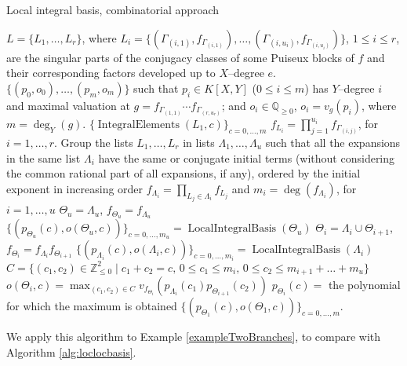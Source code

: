 \documentclass[a4paper,11pt]{amsart}%
\theoremstyle{definition}
\theoremstyle{plain}
\theoremstyle{remark}
\DeclareMathOperator{\LocalIntegralBasis}{LocalIntegralBasis}
\DeclareMathOperator{\IntegralElement}{IntegralElements}
\newcommand{\Q}{{\mathbb Q}}
\newcommand{\Z}{{\mathbb Z}}
\begin{document}
\begin{algorithm}                      %
\caption{Local integral basis, combinatorial approach}          %
\label{alg:directApproach}
\begin{algorithmic}[1]
\REQUIRE $L = \{L_1, \dots, L_r\}$, where $L_i = \{(\varGamma_{(i,1)}, f_{\varGamma_{(i,1)}}),
\dots, (\varGamma_{(i, u_i)}, f_{\varGamma_{(i, u_i)}})\}$, $1 \leq i \leq r$, are
the singular parts of the conjugacy classes of some Puiseux blocks of $f$ and their corresponding factors developed
up to $X$--degree $e$.
\ENSURE $\{(p_0, o_0), \dots, (p_{m}, o_{m})\}$ such that $p_i \in K[X,Y]$ ($0 \leq i \leq m$) has $Y$--degree $i$ and
maximal valuation at $g = f_{\varGamma_{(1,1)}}\cdots f_{\varGamma_{(r,u_r)}}$; and $o_i \in \Q_{\geq 0}$, $o_i = v_g(p_i) $, where $m = \deg_Y(g)$.
\RETURN $\{\IntegralElement(L_1, c)\}_{c= 0, \dots, m}$
\ELSE
\STATE $f_{L_i} = \prod_{j = 1}^{u_i} f_{\varGamma_{(i, j)}}$, for $i = 1, \dots, r$.
\STATE Group the lists $L_1, \dots, L_r$ in lists $\varLambda_1, \dots, \varLambda_u$
such that all the expansions in the same
list $\varLambda_{i}$ have the same or conjugate initial terms
(without considering the common rational part of all expansions, if any),
ordered by the initial exponent in increasing order
\STATE $f_{\varLambda_i} = \prod_{L_j \in \varLambda_i} f_{L_j}$ and $m_i = \deg(f_{\varLambda_i})$, for $i = 1, \dots, u$
\STATE $\varTheta_u = \varLambda_u$, $f_{\varTheta_u} = f_{\varLambda_u}$
\STATE $\{(p_{\varTheta_u}(c), o(\varTheta_u, c))\}_{c = 0, \dots, m_u} = \LocalIntegralBasis(\varTheta_u)$
\STATE $\varTheta_i = \varLambda_i \cup \varTheta_{i+1}$, $f_{\varTheta_i} = f_{\varLambda_i} f_{\varTheta_{i+1}}$
\STATE $\{(p_{\varLambda_i}(c), o(\varLambda_i, c))\}_{c = 0, \dots, m_i} = \LocalIntegralBasis(\varLambda_i)$
\STATE $C = \{(c_1, c_2) \in \Z_{\leq 0}^2 \mid c_1 + c_2 = c\mbox{, }0 \leq c_1 \leq m_i\mbox{, }0 \leq c_2 \leq m_{i+1} + \dots + m_u\}$
\STATE $o(\varTheta_{i}, c) = \max_{(c_1, c_2) \in C} v_{f_{\varTheta_{i}}%
}(p_{\varLambda_{i}}(c_{1})p_{\varTheta_{i+1}}(c_{2}))$
\STATE $p_{\varTheta_i}(c) = $ the polynomial for which the maximum is obtained
\ENDFOR
\ENDFOR
\RETURN $\{(p_{\varTheta_1}(c), o(\varTheta_1, c))\}_{c = 0, \dots, m}$.
\ENDIF
\end{algorithmic}
\end{algorithm}


We apply this algorithm to Example \ref{exampleTwoBranches}, to compare with
Algorithm \ref{alg:loclocbasis}.
\end{document}
